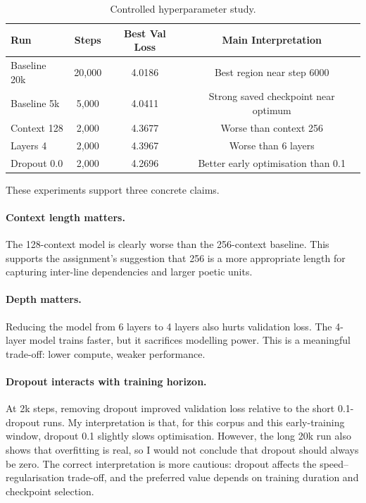 \documentclass[11pt]{article}
\begin{document}
\begin{table}[H]
    \centering
    \small
    \begin{tabular}{lccc}
        \toprule
        Run & Steps & Best Val Loss & Main Interpretation \\
        \midrule
        Baseline 20k & 20{,}000 & 4.0186 & Best region near step 6000 \\
        Baseline 5k & 5{,}000 & 4.0411 & Strong saved checkpoint near optimum \\
        Context 128 & 2{,}000 & 4.3677 & Worse than context 256 \\
        Layers 4 & 2{,}000 & 4.3967 & Worse than 6 layers \\
        Dropout 0.0 & 2{,}000 & 4.2696 & Better early optimisation than 0.1 \\
        \bottomrule
    \end{tabular}
    \caption{Controlled hyperparameter study.}
    \label{tab:hparams}
\end{table}

These experiments support three concrete claims.

\paragraph{Context length matters.}
The 128-context model is clearly worse than the 256-context baseline. This supports the assignment's suggestion that 256 is a more appropriate length for capturing inter-line dependencies and larger poetic units.

\paragraph{Depth matters.}
Reducing the model from 6 layers to 4 layers also hurts validation loss. The 4-layer model trains faster, but it sacrifices modelling power. This is a meaningful trade-off: lower compute, weaker performance.

\paragraph{Dropout interacts with training horizon.}
At 2k steps, removing dropout improved validation loss relative to the short 0.1-dropout runs. My interpretation is that, for this corpus and this early-training window, dropout 0.1 slightly slows optimisation. However, the long 20k run also shows that overfitting is real, so I would not conclude that dropout should always be zero. The correct interpretation is more cautious: dropout affects the speed--regularisation trade-off, and the preferred value depends on training duration and checkpoint selection.
\end{document}
